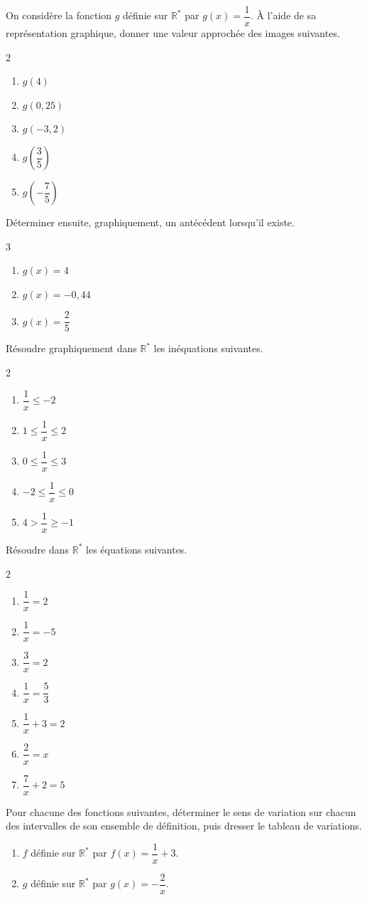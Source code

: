 \exo
On considère la fonction $g$ définie sur $\mathbb{R}^*$ par $g(x)=\dfrac{1}{x}$.
À l'aide de sa représentation graphique, donner une valeur approchée des images suivantes.
\setlength{\columnseprule}{0pt}
\begin{multicols}{2}
\begin{enumerate}
\item $g(4)$
\item $g(0,25)$
\item $g(-3,2)$
\item $g\left(\dfrac{3}{5}\right)$
\item $g\left(-\dfrac{7}{5}\right)$
\end{enumerate}
\end{multicols}

Déterminer ensuite, graphiquement, un antécédent lorsqu'il existe.
\begin{multicols}{3}
\begin{enumerate}
\item $g(x)=4$
\item $g(x)=-0,44$
\item $g(x)=\dfrac{2}{5}$
\end{enumerate}
\end{multicols}

\exo
Résoudre graphiquement dans $\mathbb{R}^*$ les inéquations suivantes.
\begin{multicols}{2}
\begin{enumerate}
\item $\dfrac{1}{x}\leq -2$
\item $1\leq \dfrac{1}{x}\leq 2$
\item $0\leq \dfrac{1}{x}\leq 3$
\item $-2\leq \dfrac{1}{x}\leq 0$
\item $4>\dfrac{1}{x}\geq -1$
\end{enumerate}
\end{multicols}

\exo
Résoudre dans $\mathbb{R}^*$ les équations suivantes.
\begin{multicols}{2}
\begin{enumerate}
\item $\dfrac{1}{x}=2$
\item $\dfrac{1}{x}=-5$
\item $\dfrac{3}{x}=2$
\item $\dfrac{1}{x}=\dfrac{5}{3}$
\item $\dfrac{1}{x}+3=2$
\item $\dfrac{2}{x}=x$
\item $\dfrac{7}{x}+2=5$
\end{enumerate}
\end{multicols}

\exo
Pour chacune des fonctions suivantes, déterminer le sens de variation sur chacun des intervalles de son ensemble de définition, puis dresser le tableau de variations.
\begin{enumerate}
\item $f$ définie sur $\mathbb{R}^*$ par $f(x)=\dfrac{1}{x}+3$.
\item $g$ définie sur $\mathbb{R}^*$ par $g(x)=-\dfrac{2}{x}$.
\end{enumerate}
